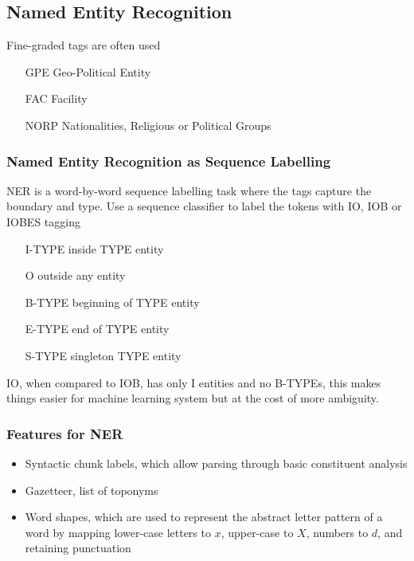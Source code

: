 \documentclass[11pt]{article}
\begin{document}
\subsection{Named Entity Recognition}
Fine-graded tags are often used
\begin{itemize}[leftmargin=*, labelindent=1.5cm, labelsep=0.5cm]
	\item[GPE] Geo-Political Entity
	\item[FAC] Facility
	\item[NORP] Nationalities, Religious or Political Groups
\end{itemize}

\subsubsection{Named Entity Recognition as Sequence Labelling}
NER is a word-by-word sequence labelling task where the tags capture the boundary and type. Use a sequence classifier to label the tokens with {\color{red} IO}, {\color{Green3} IOB} or {\color{blue} IOBES} tagging
\begin{itemize}[leftmargin=*, labelindent=2cm, labelsep=0.5cm]
	\item[{\color{red} I-TYPE}] inside TYPE entity
	\item[{\color{red} O}] outside any entity
	\item[{\color{Green3} B-TYPE}] beginning of TYPE entity
	\item[{\color{blue} E-TYPE}] end of TYPE entity
	\item[{\color{blue} S-TYPE}] singleton TYPE entity
\end{itemize}
IO, when compared to IOB, has only I entities and no B-TYPEs, this makes things easier for machine learning system but at the cost of more ambiguity.

\subsubsection{Features for NER}
\begin{itemize}
	\item Syntactic chunk labels, which allow parsing through basic constituent analysis
	\item Gazetteer, list of toponyms
	\item Word shapes, which are used to represent the abstract letter pattern of a word by mapping lower-case letters to $x$, upper-case to $X$, numbers to $d$, and retaining punctuation
\end{itemize}
\end{document}
